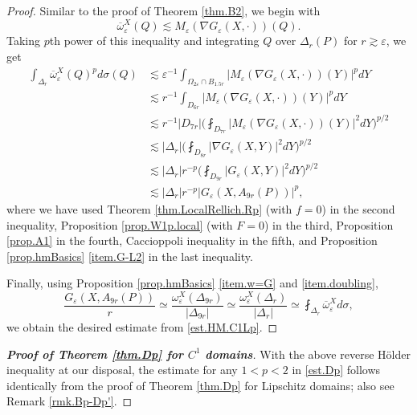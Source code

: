 \documentclass[reqno,12pt]{amsart} %
\theoremstyle{definition}
\theoremstyle{remark}
\numberwithin{equation}{section}
\newcommand{\e}{\varepsilon}
\begin{document}
\begin{proof}
    Similar to the proof of Theorem \ref{thm.B2}, we begin with
    \begin{equation}
        \overline{\omega}^X_\e(Q) \lesssim M_\e(\nabla G_\e(X,\cdot))(Q).
    \end{equation}
    Taking $p$th power of this inequality and integrating $Q$ over $\Delta_r(P)$ for $r\gtrsim \e$, we get
    \begin{equation}\label{est.HM.C1Lp}
    \begin{aligned}
        \int_{\Delta_r} \overline{\omega}_\e^X(Q)^p d\sigma(Q) & \lesssim \e^{-1} \int_{\Omega_{2\e} \cap B_{1.5r}} |M_\e(\nabla G_\e(X,\cdot))(Y)|^p dY \\
        & \lesssim r^{-1} \int_{D_{6r}} |M_\e(\nabla G_\e(X,\cdot))(Y)|^p dY \\
        & \lesssim r^{-1}|D_{7r}| \bigg( \fint_{D_{7r}} |M_\e(\nabla G_\e(X,\cdot))(Y)|^2 dY \bigg)^{p/2} \\
        & \lesssim |\Delta_r| \bigg( \fint_{D_{8r}} |\nabla G_\e(X,Y)|^2 dY \bigg)^{p/2} \\
        & \lesssim |\Delta_r| r^{-p} \bigg( \fint_{D_{9r}} |G_\e(X,Y)|^2 dY \bigg)^{p/2} \\
        & \lesssim |\Delta_r| r^{-p} |G_\e(X, A_{9r}(P))|^p,
    \end{aligned}
    \end{equation}
    where we have used Theorem \ref{thm.LocalRellich.Rp} (with $f = 0$) in the second inequality, Proposition \ref{prop.W1p.local} (with $F = 0$) in the third, Proposition \ref{prop.A1} in the fourth, Caccioppoli inequality in the fifth, and Proposition \ref{prop.hmBasics} \ref{item.G-L2} in the last inequality.
    
     Finally, using Proposition \ref{prop.hmBasics} \ref{item.w=G} and \ref{item.doubling},
\begin{equation}
    \frac{G_\e(X,A_{9r}(P))}{r} \simeq \frac{\omega_\e^X(\Delta_{9r})}{|\Delta_{9r}|} \simeq \frac{\omega_\e^X(\Delta_{r})}{|\Delta_{r}|} \simeq \fint_{\Delta_r} \overline{\omega}_\e^X d\sigma,
\end{equation}
    we obtain the desired estimate from \eqref{est.HM.C1Lp}.
\end{proof}

\begin{proof}[\textbf{Proof of Theorem \ref{thm.Dp} for $C^1$ domains}]
   With the above reverse H\"{o}lder inequality at our disposal, the estimate for any $1<p<2$ in \eqref{est.Dp} follows identically from the proof of Theorem \ref{thm.Dp} for Lipschitz domains; also see Remark \ref{rmk.Bp-Dp'}. 
\end{proof}
\end{document}
